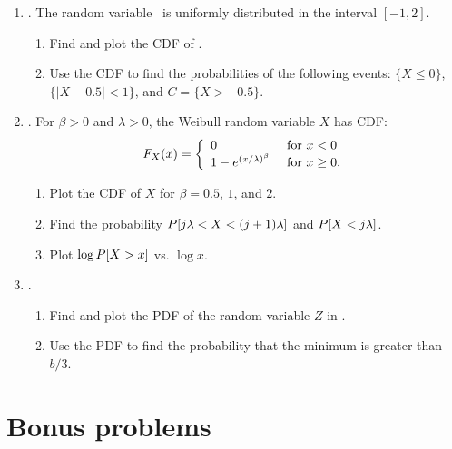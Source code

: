 \begin{enumerate}
	\item {}.
	The random variable \X\ is uniformly distributed in the interval
	$[-1, 2]$.
	\begin{enumerate}
		\item Find and plot the CDF of \X.
		\item Use the CDF to find the probabilities of the following events:
		$\{X \leq 0\}$,
		$\{|X - 0.5| < 1\}$,
		and $C = \{X > -0.5\}$.
	\end{enumerate}

	\item {}.
	For $\beta > 0$ and $\lambda > 0$,
	the Weibull random variable $X$ has CDF:
	\begin{equation}
		F_{X}(x) = \left\{\begin{array}{ll}
		0	&\mbox{ for } x< 0
		\\1-e^{(x/\lambda)^\beta}	&\mbox{ for } x \geq 0.
		\end{array}\right.
	\end{equation}
	\begin{enumerate}
	\item Plot the CDF of $X$ for $\beta = 0.5$, $1$, and $2$.
	\item Find the probability $P[j\lambda < X < (j + 1)\lambda]$
	and $P[X < j\lambda]$.
	\item Plot $\log P[X > x]$ vs. $\log x$.

	\end{enumerate}

	\item {}.
	\begin{enumerate}
		\item Find and plot the PDF of the random variable $Z$ in .
		\item Use the PDF to find the probability that the minimum is greater than $b/3$.
	\end{enumerate}

\end{enumerate}

\section*{Bonus problems}

